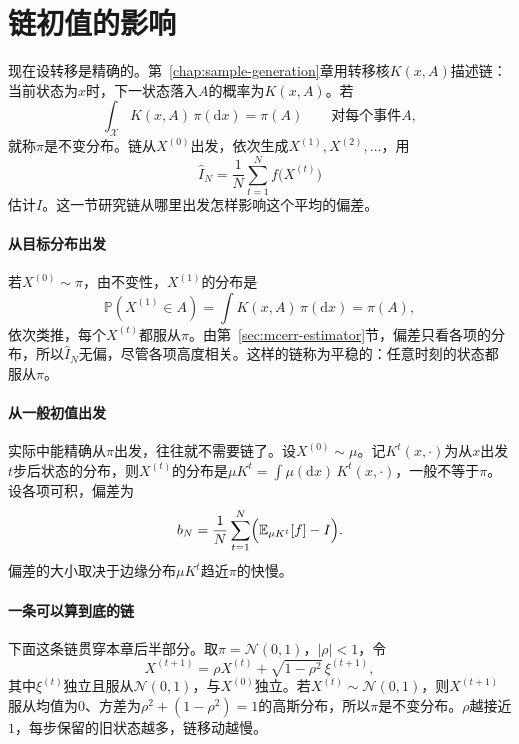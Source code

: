 \section{链初值的影响}
\label{sec:mcerr-initial}

现在设转移是精确的。第~\ref{chap:sample-generation}章用转移核$K(x,A)$描述链：当前状态为$x$时，下一状态落入$A$的概率为$K(x,A)$。若
\[
 \int_{\mathcal{X}}K(x,A)\,\pi(\mathrm{d}x)=\pi(A)\qquad\text{对每个事件}A ,
\]
就称$\pi$是不变分布。链从$X^{(0)}$出发，依次生成$X^{(1)},X^{(2)},\dots$，用
\begin{equation}
 \hat{I}_N=\frac1N\sum_{t=1}^{N}f\bigl(X^{(t)}\bigr)
 \label{eq:mcerr-chain-average}
\end{equation}
估计$I$。这一节研究链从哪里出发怎样影响这个平均的偏差。

\paragraph{从目标分布出发}
若$X^{(0)}\sim\pi$，由不变性，$X^{(1)}$的分布是
\[
 \mathbb{P}(X^{(1)}\in A)=\int K(x,A)\,\pi(\mathrm{d}x)=\pi(A) ,
\]
依次类推，每个$X^{(t)}$都服从$\pi$。由第~\ref{sec:mcerr-estimator}节，偏差只看各项的分布，所以$\hat{I}_N$无偏，尽管各项高度相关。这样的链称为平稳的：任意时刻的状态都服从$\pi$。

\paragraph{从一般初值出发}
实际中能精确从$\pi$出发，往往就不需要链了。设$X^{(0)}\sim\mu$。记$K^{t}(x,\cdot)$为从$x$出发$t$步后状态的分布，则$X^{(t)}$的分布是$\mu K^{t}=\int\mu(\mathrm{d}x)\,K^{t}(x,\cdot)$，一般不等于$\pi$。设各项可积，偏差为
\begin{equation}
 b_N=\frac1N\sum_{t=1}^{N}\Bigl(\mathbb{E}_{\mu K^{t}}[f]-I\Bigr) .
 \label{eq:mcerr-initial-bias}
\end{equation}
偏差的大小取决于边缘分布$\mu K^{t}$趋近$\pi$的快慢。

\paragraph{一条可以算到底的链}
下面这条链贯穿本章后半部分。取$\pi=\mathcal{N}(0,1)$，$\lvert\rho\rvert<1$，令
\begin{equation}
 X^{(t+1)}=\rho X^{(t)}+\sqrt{1-\rho^{2}}\,\xi^{(t+1)} ,
 \label{eq:mcerr-ar1}
\end{equation}
其中$\xi^{(t)}$独立且服从$\mathcal{N}(0,1)$，与$X^{(0)}$独立。若$X^{(t)}\sim\mathcal{N}(0,1)$，则$X^{(t+1)}$服从均值为$0$、方差为$\rho^{2}+(1-\rho^{2})=1$的高斯分布，所以$\pi$是不变分布。$\rho$越接近$1$，每步保留的旧状态越多，链移动越慢。

